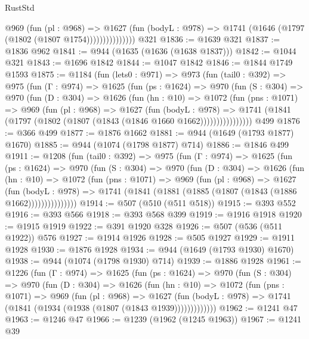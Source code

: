 \begin{lexlean}{RustStd}
\begin{coremodule}
{\begin{coremodule}
{{{{{{{{{{                    @969
                      (fun (pl : @968) =>
                      @1627
                        (fun (bodyL : @978) =>
                        @1741 (@1646 (@1797 (@1802 (@1807 @1754)))))))))))))))
    @321
@1836 := @1639 @321
@1837 := @1836 @962
@1841 := @944 (@1635 (@1636 (@1638 @1837)))
@1842 := @1044 @321
@1843 := @1696 @1842
@1844 := @1047 @1842
@1846 := @1844 @1749 @1593
@1875 := @1184
    (fun (lets0 : @971) =>
    @973
      (fun (tail0 : @392) =>
      @975
        (fun (Γ : @974) =>
        @1625
          (fun (ps : @1624) =>
          @970
            (fun (S : @304) =>
            @970
              (fun (D : @304) =>
              @1626
                (fun (hn : @10) =>
                @1072
                  (fun (pns : @1071) =>
                  @969
                    (fun (pl : @968) =>
                    @1627
                      (fun (bodyL : @978) =>
                      @1741 (@1841 (@1797 (@1802 (@1807 (@1843 (@1846 @1660 @1662))))))))))))))))
    @499
@1876 := @366 @499
@1877 := @1876 @1662
@1881 := @944 (@1649 (@1793 @1877) @1670)
@1885 := @944 (@1074 (@1798 @1877) @714)
@1886 := @1846 @499
@1911 := @1208
    (fun (tail0 : @392) =>
    @975
      (fun (Γ : @974) =>
      @1625
        (fun (ps : @1624) =>
        @970
          (fun (S : @304) =>
          @970
            (fun (D : @304) =>
            @1626
              (fun (hn : @10) =>
              @1072
                (fun (pns : @1071) =>
                @969
                  (fun (pl : @968) =>
                  @1627
                    (fun (bodyL : @978) =>
                    @1741 (@1841 (@1881 (@1885 (@1807 (@1843 (@1886 @1662)))))))))))))))
@1914 := @507 (@510 (@511 @518))
@1915 := @393 @552
@1916 := @393 @566
@1918 := @393 @568 @399
@1919 := @1916 @1918
@1920 := @1915 @1919
@1922 := @391 @1920 @328
@1926 := @507 (@536 (@511 @1922)) @576
@1927 := @1914 @1926
@1928 := @505 @1927
@1929 := @1911 @1928
@1930 := @1876 @1928
@1934 := @944 (@1649 (@1793 @1930) @1670)
@1938 := @944 (@1074 (@1798 @1930) @714)
@1939 := @1886 @1928
@1961 := @1226
    (fun (Γ : @974) =>
    @1625
      (fun (ps : @1624) =>
      @970
        (fun (S : @304) =>
        @970
          (fun (D : @304) =>
          @1626
            (fun (hn : @10) =>
            @1072
              (fun (pns : @1071) =>
              @969
                (fun (pl : @968) =>
                @1627
                  (fun (bodyL : @978) => @1741 (@1841 (@1934 (@1938 (@1807 (@1843 @1939)))))))))))))
@1962 := @1241 @47
@1963 := @1246 @47
@1966 := @1239 (@1962 (@1245 @1963))
@1967 := @1241 @39
}}}}}}}}}}
\end{coremodule}}
\end{coremodule}
\end{lexlean}
